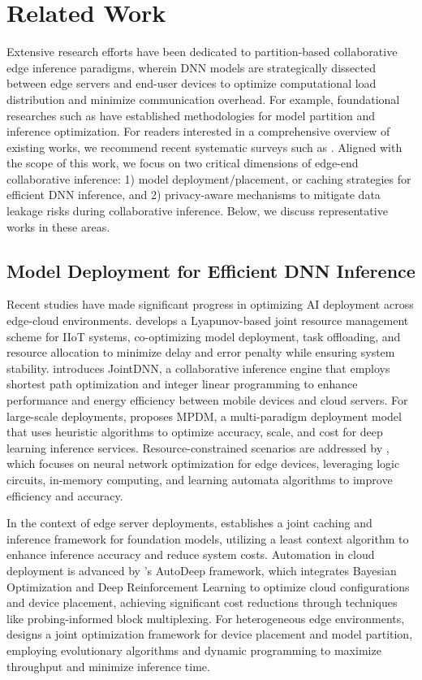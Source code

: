 \section{Related Work}
Extensive research efforts have been dedicated to partition-based collaborative edge inference paradigms, wherein DNN models are strategically dissected between edge servers and end-user devices to optimize computational load distribution and minimize communication overhead. For example, foundational researches such as \cite{c10,c21,c22} have established methodologies for model partition and inference optimization. For readers interested in a comprehensive overview of existing works, we recommend recent systematic surveys such as \cite{c4,c23,c24,c25}. Aligned with the scope of this work, we focus on two critical dimensions of edge-end collaborative inference: 1) model deployment/placement, or caching strategies for efficient DNN inference, and 2) privacy-aware mechanisms to mitigate data leakage risks during collaborative inference. Below, we discuss representative works in these areas.

\subsection{Model Deployment for Efficient DNN Inference}
Recent studies have made significant progress in optimizing AI deployment across edge-cloud environments. \cite{c15} develops a Lyapunov-based joint resource management scheme for IIoT systems, co-optimizing model deployment, task offloading, and resource allocation to minimize delay and error penalty while ensuring system stability. \cite{c26} introduces JointDNN, a collaborative inference engine that employs shortest path optimization and integer linear programming to enhance performance and energy efficiency between mobile devices and cloud servers. For large-scale deployments, \cite{c27} proposes MPDM, a multi-paradigm deployment model that uses heuristic algorithms to optimize accuracy, scale, and cost for deep learning inference services. Resource-constrained scenarios are addressed by \cite{c28}, which focuses on neural network optimization for edge devices, leveraging logic circuits, in-memory computing, and learning automata algorithms to improve efficiency and accuracy.

In the context of edge server deployments, \cite{c29} establishes a joint caching and inference framework for foundation models, utilizing a least context algorithm to enhance inference accuracy and reduce system costs. Automation in cloud deployment is advanced by \cite{c30}'s AutoDeep framework, which integrates Bayesian Optimization and Deep Reinforcement Learning to optimize cloud configurations and device placement, achieving significant cost reductions through techniques like probing-informed block multiplexing. For heterogeneous edge environments, \cite{c31} designs a joint optimization framework for device placement and model partition, employing evolutionary algorithms and dynamic programming to maximize throughput and minimize inference time.

